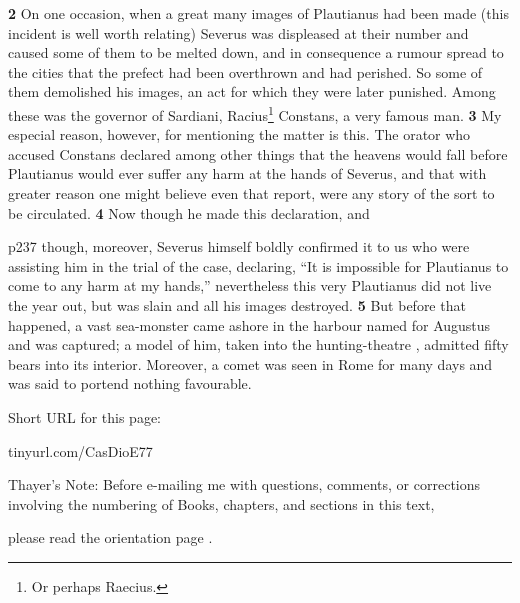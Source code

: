 \textbf{2} On one occasion, when a great many images of Plautianus had been made (this incident is well worth relating) Severus was displeased at their number and caused some of them to be melted down, and in consequence a rumour spread to the cities that the prefect had been overthrown and had perished. So some of them demolished his images, an act for which they were later punished. Among these was the governor of Sardiani, Racius\texthebrew{⁠}\footnote{Or perhaps Raecius.} Constans, a very famous man. \textbf{3} My especial reason, however, for mentioning the matter is this. The orator who accused Constans declared among other things that the heavens would fall before Plautianus would ever suffer any harm at the hands of Severus, and that with greater reason one might believe even that report, were any story of the sort to be circulated. \textbf{4} Now though he made this declaration, and

p237 though, moreover, Severus himself boldly confirmed it to us who were assisting him in the trial of the case, declaring, ``It is impossible for Plautianus to come to any harm at my hands,'' nevertheless this very Plautianus did not live the year out, but was slain and all his images destroyed. \textbf{5} But before that happened, a vast sea-monster came ashore in the harbour named for Augustus and was captured; a model of him, taken into the hunting-theatre , admitted fifty bears into its interior. Moreover, a comet was seen in Rome for many days and was said to portend nothing favourable.


Short URL for this page:

tinyurl.com/CasDioE77

Thayer's Note: Before e-mailing me with questions, comments, or corrections involving the numbering of Books, chapters, and sections in this text,

please read the orientation page .

